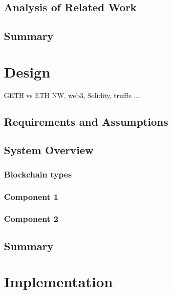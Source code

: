 \section{Analysis of Related Work}

\section{Summary}

\chapter{Design}
\label{ch:design}

GETH vs ETH NW, web3, Solidity, truffle ...

\section{Requirements and Assumptions}

\section{System Overview}


\subsection{Blockchain types}


\subsection{Component 1}

\subsection{Component 2}

\section{Summary}

\chapter{Implementation}

